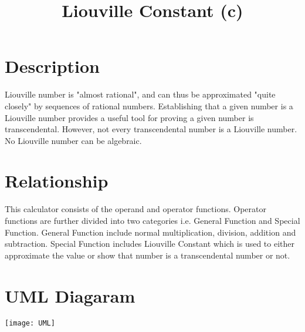 \documentclass[13pt letterpaper]{article}
\begin{document}
\title{\textbf{Liouville Constant (c)}}
\maketitle
\section{Description}
Liouville number is "almost rational", and can thus be approximated "quite closely" by sequences of rational numbers. Establishing that a given number is a Liouville number provides a useful tool for proving a given number is transcendental. However, not every transcendental number is a Liouville number. No Liouville number can be algebraic.
\section{Relationship}
This calculator consists of the operand and operator functions. Operator functions are further divided into two categories i.e. General Function and Special Function.
General Function include normal multiplication, division, addition and subtraction.
Special Function includes Liouville Constant which is used to either approximate the value or show that number is a transcendental number or not.
\section{UML Diagaram}
\texttt{[image: UML]}
\end{document}
